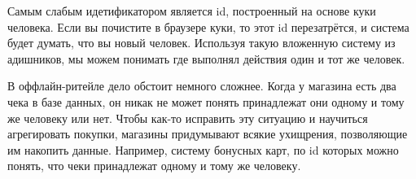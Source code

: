 \documentclass[12pt, a4paper, oneside]{article}
\begin{document}
Самым слабым идетификатором является id, построенный на основе куки человека. Если вы почистите в браузере куки, то этот id перезатрётся, и система будет думать, что вы новый человек.  Используя такую вложенную систему из адишников, мы можем понимать где выполнял действия один и тот же человек. 

В оффлайн-ритейле дело обстоит немного сложнее. Когда у магазина есть два чека в базе данных, он никак не может понять принадлежат они одному и тому же человеку или нет. Чтобы как-то исправить эту ситуацию и научиться агрегировать покупки, магазины придумывают всякие ухищрения, позволяющие им накопить данные. Например, систему бонусных карт, по id которых можно понять, что чеки принадлежат одному и тому же человеку. 
\end{document}
